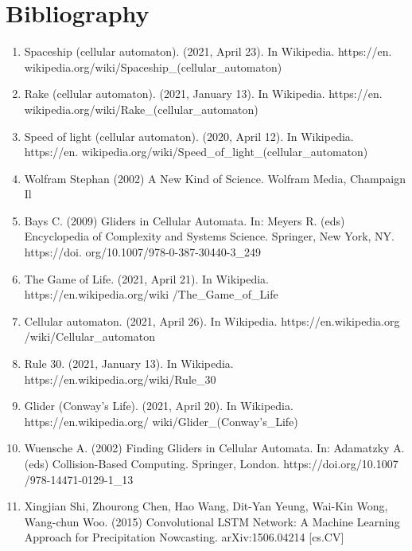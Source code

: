 \documentclass[12pt]{article}
\numberwithin{figure}{section} %
\begin{document}
\newpage
\section{Bibliography}
\begin{enumerate}[topsep=0pt,itemsep=-1ex,partopsep=1ex,parsep=1ex]
\item Spaceship (cellular automaton). (2021, April 23). In Wikipedia. https://en.\linebreak
wikipedia.org/wiki/Spaceship\_(cellular\_automaton)
\item Rake (cellular automaton). (2021, January 13). In Wikipedia. https://en.\linebreak
wikipedia.org/wiki/Rake\_(cellular\_automaton)
\item Speed of light (cellular automaton). (2020, April 12). In Wikipedia. https://en.\linebreak
wikipedia.org/wiki/Speed\_of\_light\_(cellular\_automaton)
\item Wolfram Stephan (2002) A New Kind of Science. Wolfram Media, Champaign Il
\item Bays C. (2009) Gliders in Cellular Automata. In: Meyers R. (eds) Encyclopedia of Complexity and Systems Science. Springer, New York, NY. 
https://doi.\linebreak
org/10.1007/978-0-387-30440-3\_249
\item The Game of Life. (2021, April 21). In Wikipedia. 
https://en.wikipedia.org/wiki\linebreak
/The\_Game\_of\_Life
\item Cellular automaton. (2021, April 26). In Wikipedia. 
https://en.wikipedia.org\linebreak
/wiki/Cellular\_automaton
\item Rule 30. (2021, January 13). In Wikipedia. 
https://en.wikipedia.org/wiki/Rule\_30
\item Glider (Conway’s Life). (2021, April 20). In Wikipedia. 
https://en.wikipedia.org/\linebreak
wiki/Glider\_(Conway’s\_Life)
\item Wuensche A. (2002) Finding Gliders in Cellular Automata. In: Adamatzky A. (eds) Collision-Based Computing. Springer, London. 
https://doi.org/10.1007\linebreak
/978-14471-0129-1\_13
\item Xingjian Shi, Zhourong Chen, Hao Wang, Dit-Yan Yeung, Wai-Kin Wong, Wang-chun Woo. (2015) Convolutional LSTM Network: A Machine Learning Approach for Precipitation Nowcasting. arXiv:1506.04214 [cs.CV]

\end{enumerate}
\end{document}
